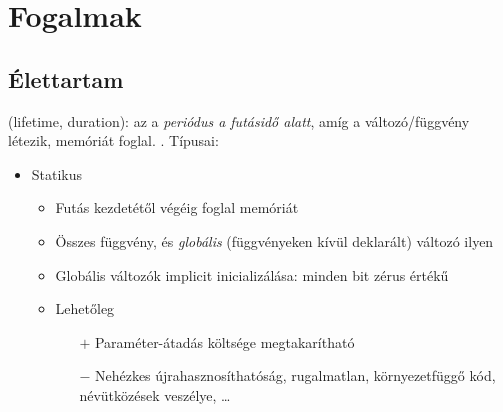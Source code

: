 \documentclass[usenames,dvipsnames,aspectratio=169]{beamer}
\begin{document}
\section{Fogalmak}
\subsection{Élettartam}
\begin{frame}
   (lifetime, duration): az a \emph{periódus a futásidő alatt}, amíg a változó/függvény létezik, memóriát 
  foglal. . Típusai:
  \begin{itemize}
    \item Statikus
    \begin{itemize}
      \item Futás kezdetétől végéig foglal memóriát
      \item Összes függvény, és \emph{globális} (függvényeken kívül deklarált) változó ilyen
      \item Globális változók implicit inicializálása: minden bit zérus értékű
      \item Lehetőleg 
      \begin{itemize}
        \item[$+$] Paraméter-átadás költsége megtakarítható
        \item[$-$] Nehézkes újrahasznosíthatóság, rugalmatlan, környezetfüggő kód, névütközések veszélye, \dots
      \end{itemize}
    \end{itemize}
  \end{itemize}
\end{frame}
\end{document}
